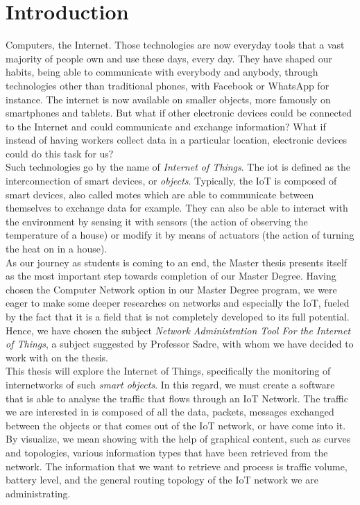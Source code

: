\chapter*{Introduction}


Computers, the Internet. Those technologies are now everyday tools that a vast majority of people own and use these days, every day. They have shaped our habits, being able to communicate with everybody and anybody, through technologies other than traditional phones, with Facebook or WhatsApp for instance. The internet is now available on smaller objects, more famously on smartphones and tablets. But what if other electronic devices could be connected to the Internet and could communicate and exchange information? What if instead of having workers collect data in a particular location, electronic devices could do this task for us?\\

Such technologies go by the name of \textit{Internet of Things}. The \acrfull{iot} is defined as the interconnection of smart devices, or \textit{objects}. Typically, the IoT is composed of smart devices, also called motes which are able to communicate between themselves to exchange data for example. They can also be able to interact with the environment by sensing it with sensors (the action of observing the temperature of a house) or modify it by means of actuators (the action of turning the heat on in a house).\\

As our journey as students is coming to an end, the Master thesis presents itself as the most important step towards completion of our Master Degree.  Having chosen the Computer Network option in our Master Degree program, we were eager to make some deeper researches on networks and especially the IoT, fueled by the fact that it is a field that is not completely developed to its full potential. Hence, we have chosen the subject \textit{Network Administration Tool For the Internet of Things}, a subject suggested by Professor Sadre, with whom we have decided to work with on the thesis. \\

This thesis will explore the Internet of Things, specifically the monitoring of internetworks of such \textit{smart objects}. In this regard, we must create a software that is able to analyse the traffic that flows through an IoT Network. The traffic we are interested in is composed of all the data, packets, messages exchanged between the objects or that comes out of the IoT network, or have come into it. By visualize, we mean showing with the help of graphical content, such as curves and topologies, various information types that have been retrieved from the network. The information that we want to retrieve and process is traffic volume, battery level, and the general routing topology of the IoT network we are administrating.

